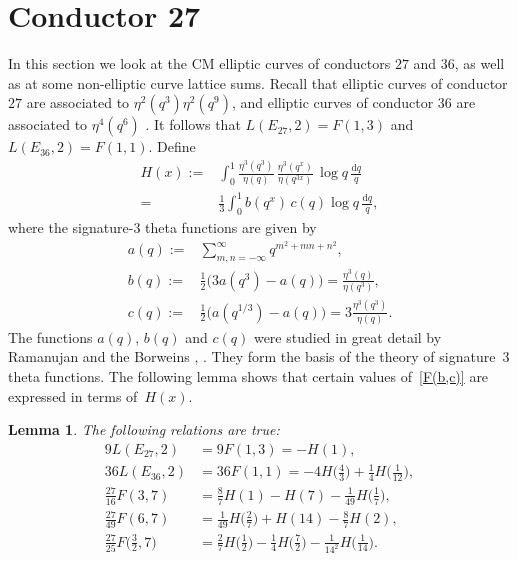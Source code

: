 \documentclass[12pt,reqno]{amsart}
\newtheorem{lemma}{Lemma}
\theoremstyle{remark}
\begin{document}
\section{Conductor 27}
\label{s-cond27}

In this section we look at the CM elliptic curves of conductors $27$
and $36$, as well as at some non-elliptic curve lattice sums. Recall
that elliptic curves of conductor $27$ are associated to
$\eta^2(q^3)\eta^2(q^9)$, and elliptic curves of conductor $36$ are
associated to $\eta^4(q^6)$ \cite{Ono}. It follows that
$L(E_{27},2)=F(1,3)$ and $L(E_{36},2)=F(1,1)$. Define
\begin{equation*}
\begin{split}
H(x):=&\int_{0}^{1}\frac{\eta^3(q^3)}{\eta(q)}\,\frac{\eta^3(q^x)}{\eta(q^{3x})}\,\log
q\,\frac{{{\mathrm d}} q}{q}\\
=&\frac{1}{3}\int_{0}^{1}b(q^{x})\,c(q)\log q\,\frac{{{\mathrm d}} q}{q},
\end{split}
\end{equation*}
where the signature-$3$ theta functions are given by
\begin{align*}
a(q):=&\sum_{m,n=-\infty}^{\infty}q^{m^2+m n+n^2},\\
b(q):=&\frac{1}{2}\bigl(3a(q^3)-a(q)\bigr)=\frac{\eta^3(q)}{\eta(q^{3})},\\
c(q):=&\frac{1}{2}\bigl(a(q^{1/3})-a(q)\bigr)=3\frac{\eta^3(q^3)}{\eta(q)}.
\end{align*}
The functions $a(q)$, $b(q)$ and $c(q)$ were studied in great detail
by Ramanujan and the Borweins \cite{Be5}, \cite{Borwein}. They form
the basis of the theory of signature~$3$ theta functions.
The following lemma shows that certain values of~\eqref{F(b,c)} are expressed in
terms of~$H(x)$.

\begin{lemma}\label{Lemma on special values of H}
The following relations are true:
\begin{align}
9L(E_{27},2)&=9F(1,3)=-H(1),
\label{F(1,3) in terms of H}\\
36L(E_{36},2)&=36 F(1,1)
=-4H\biggl(\frac{4}{3}\biggr)+\frac{1}{4}H\biggl(\frac{1}{12}\biggr),
\label{F(1,1) in terms of H}\\
\frac{27}{16}F(3,7)
&=\frac{8}{7}H(1)-H(7)-\frac{1}{49}H\biggl(\frac{1}{7}\biggr),
\label{F(3,7) in terms of H}\\
\frac{27}{49}F(6,7)
&=\frac{1}{49}H\biggl(\frac{2}{7}\biggr)+H(14)-\frac{8}{7}H(2),
\label{F(6,7) in terms of H}\\
\frac{27}{25}F\biggl(\frac{3}{2},7\biggr)
&=\frac{2}{7}H\biggl(\frac{1}{2}\biggr)-\frac{1}{4}H\biggl(\frac{7}{2}\biggr)-\frac{1}{14^2}H\biggl(\frac{1}{14}\biggr).
\label{F(3/2,7) in terms of H}
\end{align}
\end{lemma}
\end{document}
